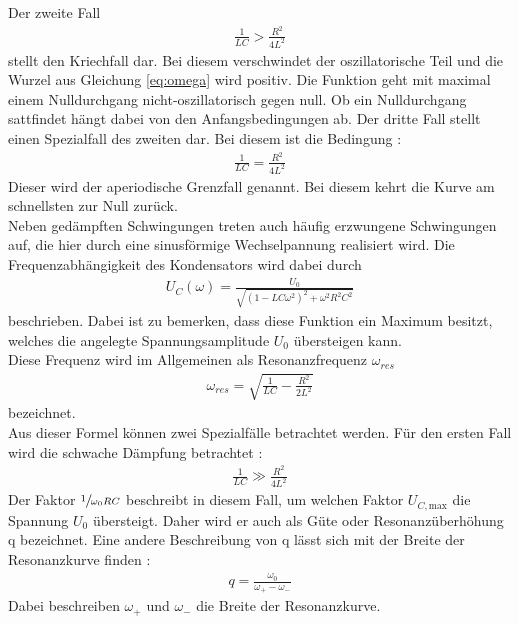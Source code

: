 \justify
Der zweite Fall \cite{V354}
\begin{align}
    \frac{1}{LC} >\frac{R^2}{4L^2} \label{eq:Fall2}
\end{align}
stellt den Kriechfall dar. Bei diesem verschwindet der oszillatorische Teil und
die Wurzel aus Gleichung \eqref{eq:omega} wird positiv.
Die Funktion geht mit maximal einem Nulldurchgang nicht-oszillatorisch gegen null.
Ob ein Nulldurchgang sattfindet hängt dabei von den Anfangsbedingungen ab.
\newpage
\justify
Der dritte Fall stellt einen Spezialfall des zweiten dar.
Bei diesem ist die Bedingung \cite{V354}:
\begin{align}
    \frac{1}{LC} = \frac{R^2}{4L^2} \label{eq:Fall3}
\end{align}
Dieser wird der aperiodische Grenzfall genannt. Bei diesem kehrt die Kurve
am schnellsten zur Null zurück.\\
Neben gedämpften Schwingungen treten auch häufig erzwungene Schwingungen auf,
die hier durch eine sinusförmige Wechselpannung realisiert wird. 
Die Frequenzabhängigkeit des Kondensators wird dabei durch 
\begin{align}
    U_C (\omega)=\frac{U_0}{\sqrt{(1-LC\omega ^2)^2+\omega ^2 R^2 C^2}} \label{eq:9}
\end{align}
beschrieben.
Dabei ist zu bemerken, dass diese Funktion ein Maximum besitzt, welches die
angelegte Spannungsamplitude $U_0$ übersteigen kann.\\
Diese Frequenz wird im Allgemeinen als Resonanzfrequenz $\omega_{res}$ \cite{V354} 
\begin{align}
    \omega_{res} = \sqrt{\frac{1}{LC}-\frac{R^2}{2L^2}} \label{eq:omegares}
\end{align}
bezeichnet.\\
Aus dieser Formel können zwei Spezialfälle betrachtet werden.
Für den ersten Fall wird die schwache Dämpfung betrachtet \cite{V354}:
\begin{align}
    \frac{1}{LC} \gg \frac{R^2}{4L^2} \label{eq:Fall1b}
\end{align}
Der Faktor $\sfrac{1}{\omega _0 RC}$ beschreibt in diesem Fall, um welchen Faktor 
$U_{C,\text{max}}$ die Spannung $U_0$ übersteigt. Daher wird er auch als Güte 
oder Resonanzüberhöhung q bezeichnet.
Eine andere Beschreibung von q lässt sich mit der Breite der 
Resonanzkurve finden \cite{V354}:
\begin{align}
    q = \frac{\omega _0}{\omega _+ - \omega _-} \label{eq:guete}
\end{align}
Dabei beschreiben $\omega _+$ und $\omega _-$ die Breite der Resonanzkurve.
